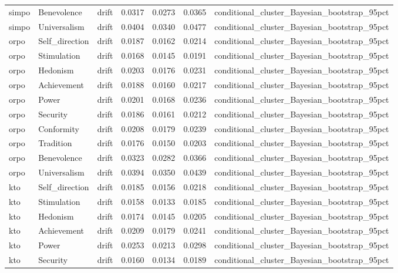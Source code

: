 \begin{tabular}{lllrrrl}
simpo & Benevolence & drift & 0.0317 & 0.0273 & 0.0365 & conditional\_cluster\_Bayesian\_bootstrap\_95pct \\
simpo & Universalism & drift & 0.0404 & 0.0340 & 0.0477 & conditional\_cluster\_Bayesian\_bootstrap\_95pct \\
orpo & Self\_direction & drift & 0.0187 & 0.0162 & 0.0214 & conditional\_cluster\_Bayesian\_bootstrap\_95pct \\
orpo & Stimulation & drift & 0.0168 & 0.0145 & 0.0191 & conditional\_cluster\_Bayesian\_bootstrap\_95pct \\
orpo & Hedonism & drift & 0.0203 & 0.0176 & 0.0231 & conditional\_cluster\_Bayesian\_bootstrap\_95pct \\
orpo & Achievement & drift & 0.0188 & 0.0160 & 0.0217 & conditional\_cluster\_Bayesian\_bootstrap\_95pct \\
orpo & Power & drift & 0.0201 & 0.0168 & 0.0236 & conditional\_cluster\_Bayesian\_bootstrap\_95pct \\
orpo & Security & drift & 0.0186 & 0.0161 & 0.0212 & conditional\_cluster\_Bayesian\_bootstrap\_95pct \\
orpo & Conformity & drift & 0.0208 & 0.0179 & 0.0239 & conditional\_cluster\_Bayesian\_bootstrap\_95pct \\
orpo & Tradition & drift & 0.0176 & 0.0150 & 0.0203 & conditional\_cluster\_Bayesian\_bootstrap\_95pct \\
orpo & Benevolence & drift & 0.0323 & 0.0282 & 0.0366 & conditional\_cluster\_Bayesian\_bootstrap\_95pct \\
orpo & Universalism & drift & 0.0394 & 0.0350 & 0.0439 & conditional\_cluster\_Bayesian\_bootstrap\_95pct \\
kto & Self\_direction & drift & 0.0185 & 0.0156 & 0.0218 & conditional\_cluster\_Bayesian\_bootstrap\_95pct \\
kto & Stimulation & drift & 0.0158 & 0.0133 & 0.0185 & conditional\_cluster\_Bayesian\_bootstrap\_95pct \\
kto & Hedonism & drift & 0.0174 & 0.0145 & 0.0205 & conditional\_cluster\_Bayesian\_bootstrap\_95pct \\
kto & Achievement & drift & 0.0209 & 0.0179 & 0.0241 & conditional\_cluster\_Bayesian\_bootstrap\_95pct \\
kto & Power & drift & 0.0253 & 0.0213 & 0.0298 & conditional\_cluster\_Bayesian\_bootstrap\_95pct \\
kto & Security & drift & 0.0160 & 0.0134 & 0.0189 & conditional\_cluster\_Bayesian\_bootstrap\_95pct \\

\end{tabular}
